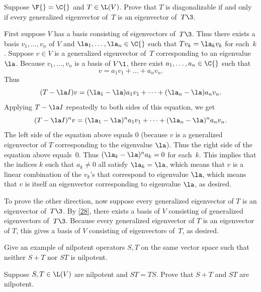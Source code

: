 \exercise
Suppose $\F{} = \C{}$ and $T \in \L(V)$. Prove that $T$ is diagonalizable if and only if every generalized eigenvector of~$T$ is an eigenvector of~$T\3$.\label{425} 

\begin{Solution}
First suppose $V$ has a basis consisting of eigenvectors of~$T\3$.  Thus there
exists a basis $v_1, \dots, v_n$ of $V$ and $\la_1, \dots, \la_n \in \C{}$ such
that $Tv_k = \la_k v_k$ for each~$k$.  Suppose $v \in V$ is a generalized
eigenvector of~$T$ corresponding to an eigenvalue~$\la$.  Because
$v_1, \dots, v_n$ is a basis of $V\1$, there exist
$a_1, \dots, a_n \in \C{}$ such that
\[
v = a_1 v_1 + \dots + a_n v_n.
\]
Thus
\[
(T - \la I)v = (\la_1 - \la)a_1 v_1 + \dots + (\la_n - \la)a_n v_n.
\]
Applying $T - \la I$ repeatedly to both sides of this equation, we get
\[
(T - \la I)^n v = (\la_1 - \la)^n a_1 v_1 + \dots + (\la_n - \la)^n a_n v_n.
\]
The left side of the equation above equals $0$ (because $v$ is a generalized
eigenvector of $T$ corresponding to the eigenvalue
$\la$).  Thus the right side of the equation above equals~$0$.
Thus $(\la_k - \la)^n a_k = 0$ for each~$k$.  This implies that the indices $k$
such that $a_k \ne 0$ all satisfy $\la_k = \la$, which means that
$v$ is a linear combination of the $v_k$'s that correspond to eigenvalue $\la$,
which means that $v$ is itself an eigenvector corresponding to eigenvalue $\la$,
as desired.

To prove the other direction, now suppose every generalized eigenvector of
$T$ is an eigenvector of~$T\3$.  By \ref{28}, there exists a basis of $V$ consisting
of generalized eigenvectors of~$T\3$.  Because every generalized eigenvector of $T$
is an eigenvector of $T$, this gives a basis of $V$ consisting of eigenvectors
of~$T$, as desired.
\end{Solution}

\exercise
\begin{subtheorem}
\item
Give an example of nilpotent operators $S, T$ on the same vector space such that neither $S+T$ nor $ST$ is nilpotent.
\item
Suppose $S, T \in \L(V)$ are nilpotent and $ST = TS$. Prove that $S + T$ and $ST$ are nilpotent.
\end{subtheorem}

